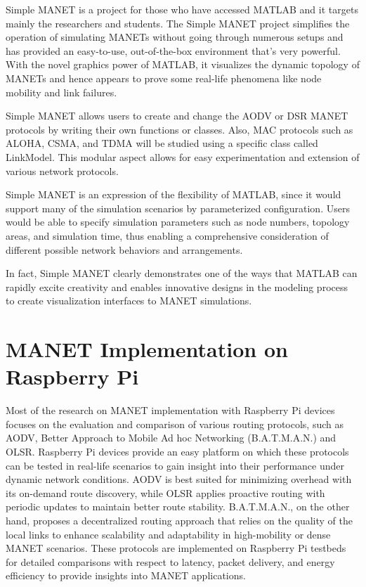 \documentclass[]{nsm-thesis}
\begin{document}
Simple MANET is a project for those who have accessed MATLAB and it targets mainly the researchers and students. The Simple MANET project simplifies the operation of simulating MANETs without going through numerous setups and has provided an easy-to-use, out-of-the-box environment that's very powerful. With the novel graphics power of MATLAB, it visualizes the dynamic topology of MANETs and hence appears to prove some real-life phenomena like node mobility and link failures.

Simple MANET allows users to create and change the AODV  or DSR  MANET protocols by writing their own functions or classes. Also, MAC protocols such as ALOHA, CSMA, and TDMA will be studied using a specific class called LinkModel. This modular aspect allows for easy experimentation and extension of various network protocols.

Simple MANET is an expression of the flexibility of MATLAB, since it would support many of the simulation scenarios by parameterized configuration. Users would be able to specify simulation parameters such as node numbers, topology areas, and simulation time, thus enabling a comprehensive consideration of different possible network behaviors and arrangements.

In fact, Simple MANET clearly demonstrates one of the ways that MATLAB can rapidly excite creativity and enables innovative designs in the modeling process to create visualization interfaces to MANET simulations.\cite{iuriivoitenko2021simplemanet}
\section{MANET Implementation on Raspberry Pi}
Most of the research on MANET implementation with Raspberry Pi devices focuses on the evaluation and comparison of various routing protocols, such as AODV, Better Approach to Mobile Ad hoc Networking (B.A.T.M.A.N.) and OLSR. Raspberry Pi devices provide an easy platform on which these protocols can be tested in real-life scenarios to gain insight into their performance under dynamic network conditions. AODV is best suited for minimizing overhead with its on-demand route discovery, while OLSR applies proactive routing with periodic updates to maintain better route stability. B.A.T.M.A.N., on the other hand, proposes a decentralized routing approach that relies on the quality of the local links to enhance scalability and adaptability in high-mobility or dense MANET scenarios. These protocols are implemented on Raspberry Pi testbeds for detailed comparisons with respect to latency, packet delivery, and energy efficiency to provide insights into MANET applications.
\end{document}
